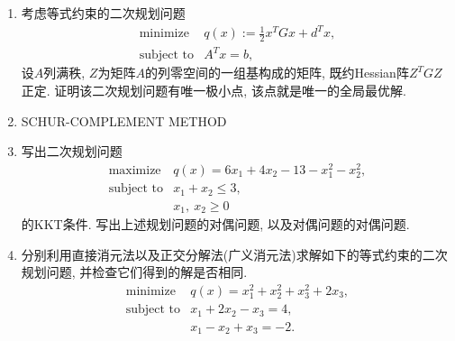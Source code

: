 \documentclass{SBCbookchapter}
\numberwithin{equation}{section}
\begin{document}
\begin{enumerate}
\item 考虑等式约束的二次规划问题
\begin{equation*}
\begin{array}{cl}
\text{minimize} & q(x) := \frac{1}{2} x^T G x + d^T x, \\
\text{subject to} & A^T x = b,
\end{array}
\end{equation*}
设$A$列满秩, $Z$为矩阵$A$的列零空间的一组基构成的矩阵, 既约Hessian阵$Z^T G Z$正定. 证明该二次规划问题有唯一极小点, 该点就是唯一的全局最优解.

\item SCHUR-COMPLEMENT METHOD

\item 写出二次规划问题
\begin{equation*}
\begin{array}{cl}
\text{maximize} & q(x) = 6x_1 + 4x_2 - 13 - x_1^2 - x_2^2, \\
\text{subject to} & x_1 + x_2 \leqslant 3, \\
& x_1, ~ x_2 \geqslant 0
\end{array}
\end{equation*}
的KKT条件. 写出上述规划问题的对偶问题, 以及对偶问题的对偶问题.

\item 分别利用直接消元法以及正交分解法(广义消元法)求解如下的等式约束的二次规划问题, 并检查它们得到的解是否相同.
\begin{equation*}
\begin{array}{cl}
\text{minimize} & q(x) = x_1^2 + x_2^2 + x_3^2 + 2x_3, \\
\text{subject to} & x_1 + 2x_2 - x_3 = 4, \\
& x_1 - x_2 + x_3 = -2.
\end{array}
\end{equation*}
\end{enumerate}



\end{document}
